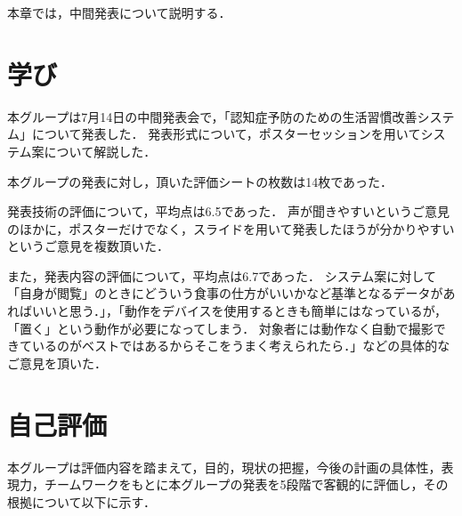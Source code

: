 \documentclass[../report]{subfiles}
\begin{document}
本章では，中間発表について説明する．

\section{学び}
本グループは7月14日の中間発表会で，「認知症予防のための生活習慣改善システム」について発表した．
発表形式について，ポスターセッションを用いてシステム案について解説した．

本グループの発表に対し，頂いた評価シートの枚数は14枚であった．

発表技術の評価について，平均点は6.5であった．
声が聞きやすいというご意見のほかに，ポスターだけでなく，スライドを用いて発表したほうが分かりやすいというご意見を複数頂いた．

また，発表内容の評価について，平均点は6.7であった．
システム案に対して「自身が閲覧」のときにどういう食事の仕方がいいかなど基準となるデータがあればいいと思う．」，「動作をデバイスを使用するときも簡単にはなっているが，「置く」という動作が必要になってしまう．
対象者には動作なく自動で撮影できているのがベストではあるからそこをうまく考えられたら．」などの具体的なご意見を頂いた．


\section{自己評価}
本グループは評価内容を踏まえて，目的，現状の把握，今後の計画の具体性，表現力，チームワークをもとに本グループの発表を5段階で客観的に評価し，その根拠について以下に示す．
\end{document}
